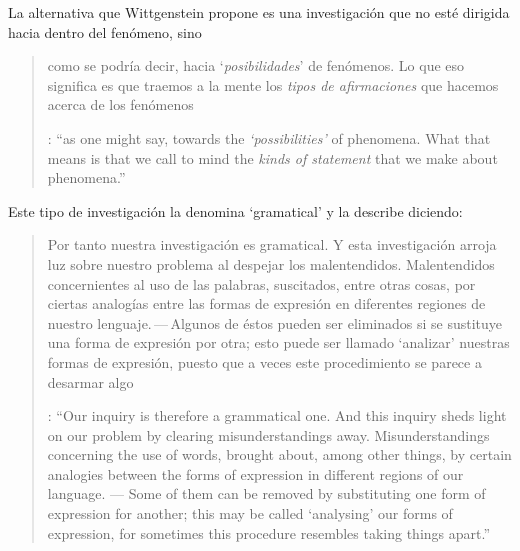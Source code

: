 La alternativa que Wittgenstein propone es una investigación que no esté dirigida hacia dentro del fenómeno, sino \blockquote[{\cite[\S90]{wittgenstein1953phiinv}}: \enquote{as one might say, towards the \emph{`possibilities'} of phenomena. What that means is that we call to mind the \emph{kinds of statement} that we make about phenomena.}]{como se podría decir, hacia `\emph{posibilidades}' de fenómenos. Lo que eso significa es que traemos a la mente los \emph{tipos de afirmaciones} que hacemos acerca de los fenómenos}. Este tipo de investigación la denomina `gramatical' y la describe diciendo: \blockquote[{\cite[\S90]{wittgenstein1953phiinv}}: \enquote{Our inquiry is therefore a grammatical one. And this inquiry sheds light on our problem by clearing misunderstandings away. Misunderstandings concerning the use of words, brought about, among other things, by certain analogies between the forms of expression in different regions of our language. --- Some of them can be removed by substituting one form of expression for another; this may be called `analysing' our forms of expression, for sometimes this procedure resembles taking things apart.}]{Por tanto nuestra investigación es gramatical. Y esta investigación arroja luz sobre nuestro problema al despejar los malentendidos. Malentendidos concernientes al uso de las palabras, suscitados, entre otras cosas, por ciertas analogías entre las formas de expresión en diferentes regiones de nuestro lenguaje.\,---\,Algunos de éstos pueden ser eliminados si se sustituye una forma de expresión por otra; esto puede ser llamado `analizar' nuestras formas de expresión, puesto que a veces este procedimiento se parece a desarmar algo}.

